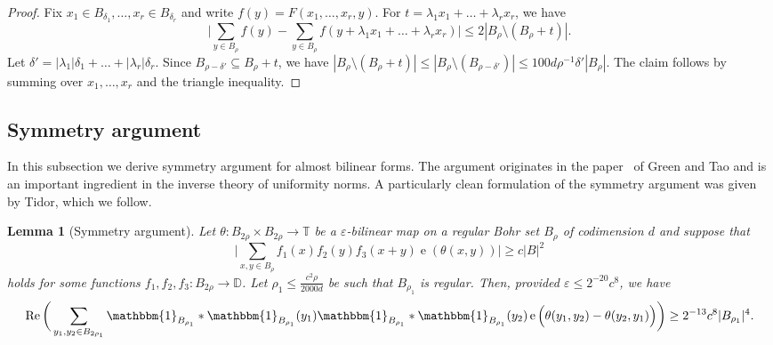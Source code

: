 \documentclass[a4paper,11pt]{article}
\numberwithin{theorem}{section}
\newtheorem{lemma}[theorem]{Lemma}
\theoremstyle{definition}
\newcommand\id{\mathbbm{1}}
\newcommand{\on}[1]{
	\operatorname{#1}
}
\begin{document}
\begin{proof}
    Fix $x_1\in B_{\delta_1}, \dots, x_r\in B_{\delta_r}$ and write $f(y) = F(x_1, \dots, x_r, y)$. For $t = \lambda_1 x_1 + \dots + \lambda_r x_r$, we have 
    \[\Big|\sum_{y \in B_\rho} f(y) - \sum_{y \in B_\rho} f(y + \lambda_1 x_1 + \dots + \lambda_r x_r)\Big| \leq 2|B_\rho \setminus (B_\rho + t)|.\]
    Let $\delta' = |\lambda_1|\delta_1 + \dots + |\lambda_r|\delta_r$. Since $B_{\rho - \delta'} \subseteq B_\rho + t$, we have $|B_\rho \setminus (B_\rho + t)| \leq |B_\rho \setminus (B_{\rho - \delta'})| \leq 100 d \rho^{-1}\delta' |B_\rho|$. The claim follows by summing over $x_1, \dots, x_r$ and the triangle inequality.
\end{proof}

\subsection{Symmetry argument}

In this subsection we derive symmetry argument for almost bilinear forms. The argument originates in the paper~\cite{GreenTaoU3} of Green and Tao and is an important ingredient in the inverse theory of uniformity norms. A particularly clean formulation of the symmetry argument was given by Tidor, which we follow.\\

\begin{lemma}[Symmetry argument]\label{symmetryArgumentBohr}
    Let $\theta : B_{2\rho} \times B_{2\rho} \to \mathbb{T}$ be a $\varepsilon$-bilinear map on a regular Bohr set $B_\rho$ of codimension $d$ and suppose that
    \[\Big|\sum_{x, y \in B_\rho} f_1(x) f_2(y) f_3(x + y) \on{e}(\theta(x,y)) \Big| \geq c |B|^2\] 
    holds for some functions $f_1, f_2, f_3 : B_{2\rho} \to \mathbb{D}$. Let $\rho_1 \leq \frac{c^2 \rho}{2000 d}$ be such that $B_{\rho_1}$ is regular. Then, provided $\varepsilon \leq 2^{-20}c^8$, we have 
    \[\on{Re}\bigg(\sum_{y_1, y_2 \in B_{2\rho_1}}  \id_{B_{\rho_1}}\ast\id_{B_{\rho_1}}(y_1) \id_{B_{\rho_1}}\ast\id_{B_{\rho_1}}(y_2) \on{e}\Big(\theta(y_1, y_2) - \theta(y_2, y_1)\Big)\bigg)\geq 2^{-13}c^8|B_{\rho_1}|^4.\]
\end{lemma}
\end{document}
